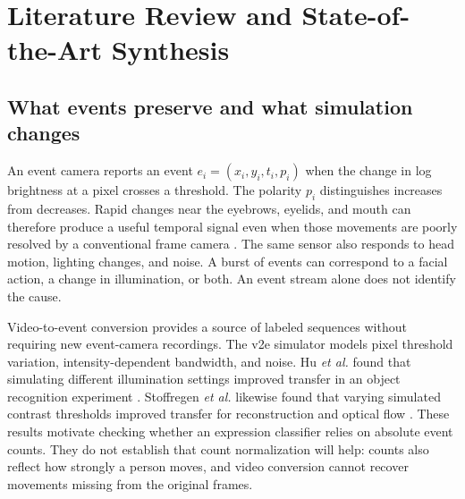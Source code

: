 \section{Literature Review and State-of-the-Art Synthesis}
\label{sec:related}

\subsection{What events preserve and what simulation changes}
An event camera reports an event $e_i=(x_i,y_i,t_i,p_i)$ when the change in log brightness at a pixel crosses a threshold. The polarity $p_i$ distinguishes increases from decreases. Rapid changes near the eyebrows, eyelids, and mouth can therefore produce a useful temporal signal even when those movements are poorly resolved by a conventional frame camera \cite{berlincioni2023,zhang2023}. The same sensor also responds to head motion, lighting changes, and noise. A burst of events can correspond to a facial action, a change in illumination, or both. An event stream alone does not identify the cause.

Video-to-event conversion provides a source of labeled sequences without requiring new event-camera recordings. The v2e simulator models pixel threshold variation, intensity-dependent bandwidth, and noise. Hu \emph{et al.} found that simulating different illumination settings improved transfer in an object recognition experiment \cite{hu2021}. Stoffregen \emph{et al.} likewise found that varying simulated contrast thresholds improved transfer for reconstruction and optical flow \cite{stoffregen2020}. These results motivate checking whether an expression classifier relies on absolute event counts. They do not establish that count normalization will help: counts also reflect how strongly a person moves, and video conversion cannot recover movements missing from the original frames.

